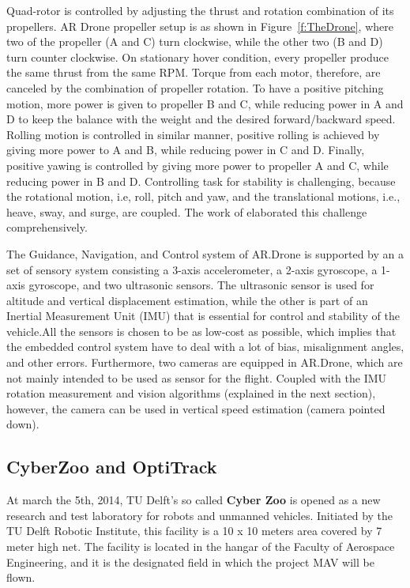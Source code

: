Quad-rotor is controlled by adjusting the thrust and rotation combination of its propellers. AR Drone propeller setup is as shown in Figure~\ref{f:TheDrone}, where two of the propeller (A and C) turn clockwise, while the other two (B and D) turn counter clockwise. On stationary hover condition, every propeller produce the same thrust from the same RPM. Torque from each motor, therefore, are canceled by the combination of propeller rotation. To have a positive pitching motion, more power is given to propeller B and C, while reducing power in A and D to keep the balance with the weight and the desired forward/backward speed. Rolling motion is controlled in similar manner, positive rolling is achieved by giving more power to A and B, while reducing power in C and D. Finally, positive yawing is controlled by giving more power to propeller A and C, while reducing power in B and D. Controlling task for stability is challenging, because the rotational motion, i.e, roll, pitch and yaw, and the translational motions, i.e., heave, sway, and surge, are coupled. The work of \cite{Bouabdallah:07} elaborated this challenge comprehensively.

The Guidance, Navigation, and Control system of AR.Drone is supported by an a set of sensory system consisting a 3-axis accelerometer, a 2-axis gyroscope, a 1-axis gyroscope, and two ultrasonic sensors. The ultrasonic sensor is used for altitude and vertical displacement estimation, while the other is part of an Inertial Measurement Unit (IMU) that is essential for control and stability of the vehicle.All the sensors is chosen to be as low-cost as possible, which implies that the embedded control system have to deal with a lot of bias, misalignment angles, and other errors\cite{Bristeau:11}. Furthermore, two cameras are equipped in AR.Drone, which are not mainly intended to be used as sensor for the flight. Coupled with the IMU rotation measurement and vision algorithms (explained in the next section), however, the camera can be used in vertical speed estimation (camera pointed down). 

\subsection{CyberZoo and OptiTrack}
At march the 5th, 2014, TU Delft's so called \textbf{Cyber Zoo} is opened as a new research and test laboratory for robots and unmanned vehicles. Initiated by the TU Delft Robotic Institute, this facility is a 10 x 10 meters area covered by 7 meter high net. The facility is located in the hangar of the Faculty of Aerospace Engineering, and it is the designated field in which the project MAV will be flown.

